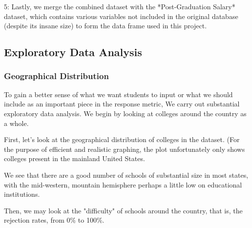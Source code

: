 \documentclass{article}\usepackage[]{graphicx}\usepackage[]{color}
\makeatletter
\newenvironment{kframe}{%
 \def\at@end@of@kframe{}%
 \ifinner\ifhmode%
  \def\at@end@of@kframe{\end{minipage}}%
  \begin{minipage}{\columnwidth}%
 \fi\fi%
 \def\FrameCommand##1{\hskip\@totalleftmargin \hskip-\fboxsep
 \colorbox{shadecolor}{##1}\hskip-\fboxsep
     \hskip-\linewidth \hskip-\@totalleftmargin \hskip\columnwidth}%
 \MakeFramed {\advance\hsize-\width
   \@totalleftmargin\z@ \linewidth\hsize
   \@setminipage}}%
 {\par\unskip\endMakeFramed%
 \at@end@of@kframe}
\newenvironment{knitrout}{}{} %
\makeatother
\begin{document}
5: Lastly, we merge the combined dataset with the *Post-Graduation Salary* dataset, which contains various variables not included in the original database (despite its insane size) to form the data frame used in this project. 

\subsection{Exploratory Data Analysis}

\subsubsection{Geographical Distribution}
To gain a better sense of what we want students to input or what we should include as an important piece in the response metric, We carry out substantial exploratory data analysis. We begin by looking at colleges around the country as a whole.

First, let's look at the geographical distribution of colleges in the dataset. (For the purpose of efficient  and realistic graphing, the plot unfortunately only shows colleges present in the mainland United States.

\begin{knitrout}
\color{fgcolor}\begin{kframe}


{\ttfamily\noindent\bfseries\color{errorcolor}{\#\# Error: 'include\_graphics' is not an exported object from 'namespace:knitr'}}\end{kframe}
\end{knitrout}

We see that there are a good number of schools of substantial size in most states, with the mid-western, mountain hemisphere perhaps a little low on educational institutions.


Then, we may look at the "difficulty" of schools around the country, that is, the rejection rates, from 0\% to 100\%. 

\begin{knitrout}
\color{fgcolor}\begin{kframe}


{\ttfamily\noindent\bfseries\color{errorcolor}{\#\# Error: 'include\_graphics' is not an exported object from 'namespace:knitr'}}\end{kframe}
\end{knitrout}
\end{document}
